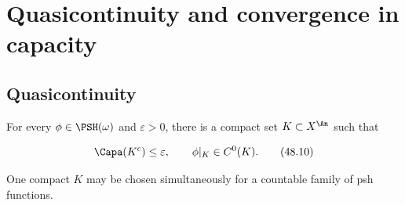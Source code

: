 \section{Quasicontinuity and convergence in capacity}
\label{sec:ch48-quasicontinuity}

\subsection{Quasicontinuity}
\label{sec:ch48-qc}

\begin{theorem}\label{thm:bj-quasicontinuity}
For every $\phi\in\PSH(\omega)$ and $\varepsilon>0$, there is a compact
set $K\subset X^{\An}$ such that

\[
                  \Capa(K^c)\leq\varepsilon,
       \qquad \phi|_K\in C^0(K).
\tag{48.10}\label{eq:bj-quasicontinuity}
\]

One compact $K$ may be chosen simultaneously for a countable family of
psh functions.
\end{theorem}


